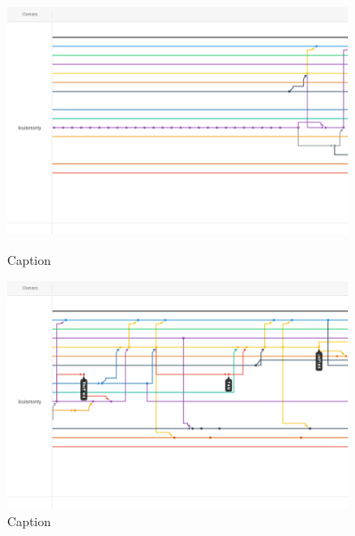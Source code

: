 \begin{figure}
    \includegraphics[width=0.9\textwidth]{Report/root/9.png}
    \caption{Caption}
    \includegraphics[width=0.9\textwidth]{Report/root/10.png}
    \caption{Caption}
    \end{figure}

